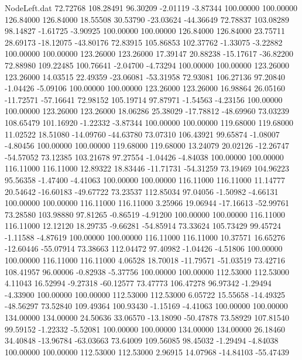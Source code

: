 \begin{filecontents}{NodeLeft.dat}
  72.72768  108.28491   96.30209    -2.01119   -3.87344  100.00000  100.00000  126.84000  126.84000   18.55508   30.53790  -23.03624  -44.36649
  72.78837  103.08289   98.14827    -1.61725   -3.90925  100.00000  100.00000  126.84000  126.84000   23.75711   28.69173  -18.12075  -43.80176
  72.83915  105.86853  102.37762    -1.33075   -3.22882  100.00000  100.00000  123.26000  123.26000   17.39147   20.88238  -15.17617  -36.82200
  72.88980  109.22485  100.76641    -2.04700   -4.73294  100.00000  100.00000  123.26000  123.26000   14.03515   22.49359  -23.06081  -53.31958
  72.93081  106.27136   97.20840    -1.04426   -5.09106  100.00000  100.00000  123.26000  123.26000   16.98864   26.05160  -11.72571  -57.16641
  72.98152  105.19714   97.87971    -1.54563   -4.23156  100.00000  100.00000  123.26000  123.26000   18.06286   25.38029  -17.78812  -48.69960
  73.03239  108.65479  101.16920    -1.22332   -3.87344  100.00000  100.00000  119.68000  119.68000   11.02522   18.51080  -14.09760  -44.63780
  73.07310  106.43921   99.65874    -1.08007   -4.80456  100.00000  100.00000  119.68000  119.68000   13.24079   20.02126  -12.26747  -54.57052
  73.12385  103.21678   97.27554    -1.04426   -4.84038  100.00000  100.00000  116.11000  116.11000   12.89322   18.83446  -11.71731  -54.31259
  73.19469  104.96223   95.56358    -1.47400   -4.41063  100.00000  100.00000  116.11000  116.11000   11.14777   20.54642  -16.60183  -49.67722
  73.23537  112.85034   97.04056    -1.50982   -4.66131  100.00000  100.00000  116.11000  116.11000    3.25966   19.06944  -17.16613  -52.99761
  73.28580  103.98880   97.81265    -0.86519   -4.91200  100.00000  100.00000  116.11000  116.11000   12.12120   18.29735   -9.66281  -54.85914
  73.33624  105.73429   99.45724    -1.11588   -4.87619  100.00000  100.00000  116.11000  116.11000   10.37571   16.65276  -12.60446  -55.07914
  73.38663  112.04472   97.40982    -1.04426   -4.51806  100.00000  100.00000  116.11000  116.11000    4.06528   18.70018  -11.79571  -51.03519
  73.42716  108.41957   96.00006    -0.82938   -5.37756  100.00000  100.00000  112.53000  112.53000    4.11043   16.52994   -9.27318  -60.12577
  73.47773  106.47278   96.97342    -1.29494   -4.33900  100.00000  100.00000  112.53000  112.53000    6.05722   15.55658  -14.49325  -48.56297
  73.52840  109.49364  100.93430    -1.15169   -4.41063  100.00000  100.00000  134.00000  134.00000   24.50636   33.06570  -13.18090  -50.47878
  73.58929  107.81540   99.59152    -1.22332   -5.52081  100.00000  100.00000  134.00000  134.00000   26.18460   34.40848  -13.96784  -63.03663
  73.64009  109.56085   98.45032    -1.29494   -4.84038  100.00000  100.00000  112.53000  112.53000    2.96915   14.07968  -14.84103  -55.47439

\end{filecontents}
